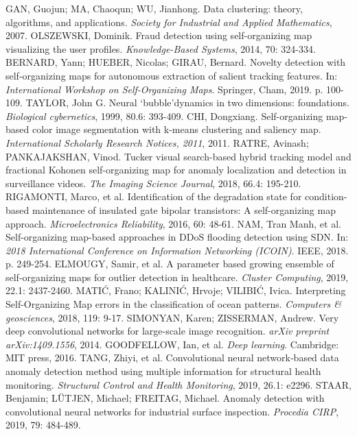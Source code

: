 \documentclass[11pt,twoside,openright]{report}
\begin{document}
\begin{thebibliography}{L}
GAN, Guojun; MA, Chaoqun; WU, Jianhong. Data clustering: theory, algorithms, and applications. \textit{Society for Industrial and Applied Mathematics}, 2007.
OLSZEWSKI, Dominik. Fraud detection using self-organizing map visualizing the user profiles. \textit{Knowledge-Based Systems}, 2014, 70: 324-334.
BERNARD, Yann; HUEBER, Nicolas; GIRAU, Bernard. Novelty detection with self-organizing maps for autonomous extraction of salient tracking features. In: \textit{International Workshop on Self-Organizing Maps}. Springer, Cham, 2019. p. 100-109.
TAYLOR, John G. Neural ‘bubble’dynamics in two dimensions: foundations. \textit{Biological cybernetics}, 1999, 80.6: 393-409.
CHI, Dongxiang. Self-organizing map-based color image segmentation with k-means clustering and saliency map. \textit{International Scholarly Research Notices, 2011}, 2011.
RATRE, Avinash; PANKAJAKSHAN, Vinod. Tucker visual search-based hybrid tracking model and fractional Kohonen self-organizing map for anomaly localization and detection in surveillance videos. \textit{The Imaging Science Journal}, 2018, 66.4: 195-210.
RIGAMONTI, Marco, et al. Identification of the degradation state for condition-based maintenance of insulated gate bipolar transistors: A self-organizing map approach. \textit{Microelectronics Reliability}, 2016, 60: 48-61.
NAM, Tran Manh, et al. Self-organizing map-based approaches in DDoS flooding detection using SDN. In: \textit{2018 International Conference on Information Networking (ICOIN)}. IEEE, 2018. p. 249-254.
ELMOUGY, Samir, et al. A parameter based growing ensemble of self-organizing maps for outlier detection in healthcare. \textit{Cluster Computing}, 2019, 22.1: 2437-2460.
MATIĆ, Frano; KALINIĆ, Hrvoje; VILIBIĆ, Ivica. Interpreting Self-Organizing Map errors in the classification of ocean patterns. \textit{Computers \& geosciences}, 2018, 119: 9-17.
SIMONYAN, Karen; ZISSERMAN, Andrew. Very deep convolutional networks for large-scale image recognition. \textit{arXiv preprint arXiv:1409.1556}, 2014.
GOODFELLOW, Ian, et al. \textit{Deep learning}. Cambridge: MIT press, 2016.
TANG, Zhiyi, et al. Convolutional neural network‐based data anomaly detection method using multiple information for structural health monitoring. \textit{Structural Control and Health Monitoring}, 2019, 26.1: e2296.
STAAR, Benjamin; LÜTJEN, Michael; FREITAG, Michael. Anomaly detection with convolutional neural networks for industrial surface inspection. \textit{Procedia CIRP}, 2019, 79: 484-489.

\end{thebibliography}
\end{document}
